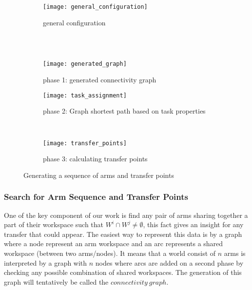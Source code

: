 \begin{figure}[t]
    \centering
    \begin{subfigure}[b]{0.4\textwidth}
        \texttt{[image: general\_configuration]}
        \caption{general configuration \\ ~~}
        \label{fig:general_configuration}
    \end{subfigure}
    ~~~~
    \begin{subfigure}[b]{0.4\textwidth}
        \texttt{[image: generated\_graph]}
        \caption{phase 1: generated connectivity graph}
        \label{fig:generated_graph}
    \end{subfigure}  
    
    \begin{subfigure}[b]{0.4\textwidth}
        \texttt{[image: task\_assignment]}
        \caption{phase 2: Graph shortest path based on task properties }
        \label{fig:task_assignment}
    \end{subfigure}
    ~~~~
    \begin{subfigure}[b]{0.4\textwidth}
        \texttt{[image: transfer\_points]}
        \caption{phase 3: calculating transfer points}
        \label{fig:transfer_points}
    \end{subfigure}
    \caption{Generating a sequence of arms and transfer points}\label{fig:animals}
\end{figure}

\subsubsection*{Search for Arm Sequence and Transfer Points}

One of the key component of our work is find any pair of arms sharing together a part of their workspace such that $W^i \cap W^j \neq \emptyset$, this fact gives an insight for any transfer that could appear. The easiest way to represent this data is by a graph where a node represent an arm workspace and an arc represents a shared workspace (between two arms/nodes). It means that a world consist of $n$ arms is interpreted by a graph with $n$ nodes where arcs are added on a second phase by checking any possible combination of shared workspaces. The generation of this graph will tentatively be called the $connectivity~graph$.

